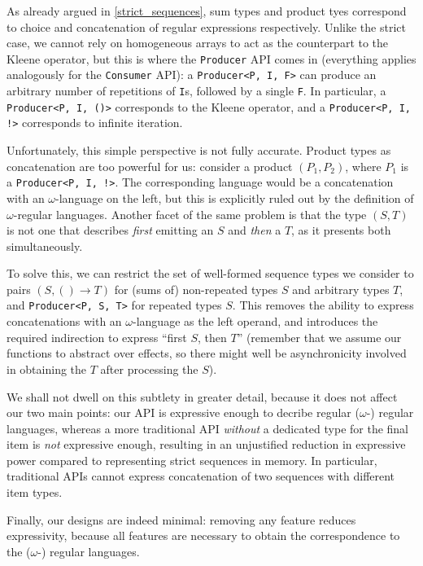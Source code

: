 \documentclass[sigplan,screen,10pt,review]{acmart}
\begin{document}
As already argued in \cref{strict_sequences}, sum types and product tyes correspond to choice and concatenation of regular expressions respectively. Unlike the strict case, we cannot rely on homogeneous arrays to act as the counterpart to the Kleene operator, but this is where the \texttt{Producer} API comes in (everything applies analogously for the \texttt{Consumer} API): a \texttt{Producer<P, I, F>} can produce an arbitrary number of repetitions of \texttt{I}s, followed by a single \texttt{F}. In particular, a \texttt{Producer<P, I, ()>} corresponds to the Kleene operator, and a \texttt{Producer<P, I, !>} corresponds to infinite iteration.

Unfortunately, this simple perspective is not fully accurate. Product types as concatenation are too powerful for us: consider a product $(P_1, P_2)$, where $P_1$ is a \texttt{Producer<P, I, !>}. The corresponding language would be a concatenation with an $\omega$-language on the left, but this is explicitly ruled out by the definition of $\omega$-regular languages. Another facet of the same problem is that the type $(S, T)$ is not one that describes \textit{first} emitting an $S$ and \textit{then} a $T$, as it presents both simultaneously.

To solve this, we can restrict the set of well-formed sequence types we consider to pairs $(S, () \rightarrow T)$ for (sums of) non-repeated types $S$ and arbitrary types $T$, and \texttt{Producer<P, S, T>} for repeated types $S$. This removes the ability to express concatenations with an $\omega$-language as the left operand, and introduces the required indirection to express ``first $S$, then $T$'' (remember that we assume our functions to abstract over effects, so there might well be asynchronicity involved in obtaining the $T$ after processing the $S$).

We shall not dwell on this subtlety in greater detail, because it does not affect our two main points: our API is expressive enough to decribe regular ($\omega$-) regular languages, whereas a more traditional API \textit{without} a dedicated type for the final item is \textit{not} expressive enough, resulting in an unjustified reduction in expressive power compared to representing strict sequences in memory. In particular, traditional APIs cannot express concatenation of two sequences with different item types.

Finally, our designs are indeed minimal: removing any feature reduces expressivity, because all features are necessary to obtain the correspondence to the ($\omega$-) regular languages.
\end{document}
